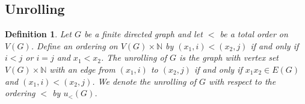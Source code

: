 \documentclass[12pt]{article}
\newtheorem{lem}[thm]{Lemma}
\newtheorem{defn}{Definition}
\theoremstyle{remark}
\newcommand{\fancy}[1]{\mathcal{#1}}
\def\G{\fancy{G}}
\begin{document}
\begin{comment}
\subsection{Partitioning}

if you can divide your graph into two so that both are not dangerous and edges go only one way between them then the whole thing is not dangerous.

\begin{lem}\label{PartitionLemma}
Let $G$ be a directed graph.  If $V(G)$ has a subset $A$ such that there are no edges from $A$ to $G - A$ and both $G[A]$ and $G - A$ are not dangerous, then $G$ is not dangerous.
\end{lem}
\begin{proof}
Assume $V(G)$ has a subset $A$ such that there are no edges from $A$ to $G - A$ and both $G[A]$ and $G - A$ are not dangerous.  Let $d$ be a denotation assignment on $V(G)$ such that $G = \G_{V(G), d}$.  Since $A$ has no edges to $G - A$ we see that $d$ restricted to $A$ is a denotation assignment on $A$, call it $d_A$.  Since $G[A]$ is not dangerous, we have an acceptable truth assignment $v_A$ on $A$ with respect to $d_A$.  Define $\kappa(0) = \bot$ and $\kappa(1) = \top$.  Now define a denotation assignment $d'$ on $G - A$ by letting $d'(x) = d(x)[\alpha \Rightarrow \kappa(v_A(\alpha)) \mid \alpha \in A]$.  Since $G - A$ is not dangerous, we have an acceptable truth assignment $v'$ on $V(G - A)$ with respect to $d'$.  By construction, the truth assignment $v$ defined by

\[v(x) = \begin{cases}
v_A(x) & \text{if } x \in A \\
v'(x) & \text{if } x \not \in A \\
\end{cases}\]

is acceptable on $V(G)$ with respect to $d$.  Since $d$ was arbitrary, $G$ is not dangerous.
\end{proof}
\end{comment}

\subsection{Unrolling}
\begin{defn}
Let $G$ be a finite directed graph and let $<$ be a total order on $V(G)$.  Define an ordering on $V(G) \times \mathbb{N}$ by $(x_1, i) < (x_2, j)$ if and only if $i < j$ or $i = j$ and $x_1 < x_2$. The \emph{unrolling} of $G$ is the graph with vertex set $V(G) \times \mathbb{N}$ with an edge from $(x_1, i)$ to $(x_2, j)$ if and only if $x_1x_2 \in E(G)$ and $(x_1, i) < (x_2, j)$.  We denote the unrolling of $G$ with respect to the ordering $<$ by $u_{<}(G)$.
\end{defn}
\end{document}

